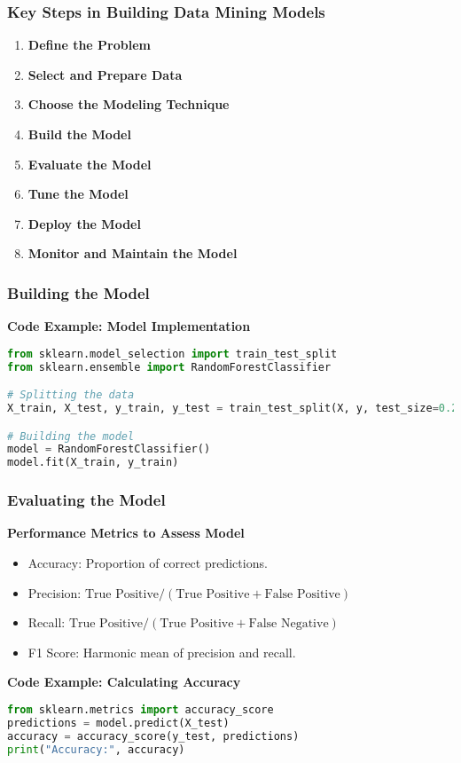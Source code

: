 \documentclass{beamer}
\begin{document}
\begin{frame}
    \frametitle{Key Steps in Building Data Mining Models}
    \begin{enumerate}
        \item \textbf{Define the Problem}
        \item \textbf{Select and Prepare Data}
        \item \textbf{Choose the Modeling Technique}
        \item \textbf{Build the Model}
        \item \textbf{Evaluate the Model}
        \item \textbf{Tune the Model}
        \item \textbf{Deploy the Model}
        \item \textbf{Monitor and Maintain the Model}
    \end{enumerate}
\end{frame}

\begin{frame}[fragile]
    \frametitle{Building the Model}
    \textbf{Code Example: Model Implementation}
    \begin{lstlisting}[language=Python]
from sklearn.model_selection import train_test_split
from sklearn.ensemble import RandomForestClassifier

# Splitting the data
X_train, X_test, y_train, y_test = train_test_split(X, y, test_size=0.2)

# Building the model
model = RandomForestClassifier()
model.fit(X_train, y_train)
    \end{lstlisting}
\end{frame}

\begin{frame}[fragile]
    \frametitle{Evaluating the Model}
    \textbf{Performance Metrics to Assess Model}
    \begin{itemize}
        \item Accuracy: Proportion of correct predictions.
        \item Precision: $\text{True Positive} / (\text{True Positive} + \text{False Positive})$
        \item Recall: $\text{True Positive} / (\text{True Positive} + \text{False Negative})$
        \item F1 Score: Harmonic mean of precision and recall.
    \end{itemize}
    
    \textbf{Code Example: Calculating Accuracy}
    \begin{lstlisting}[language=Python]
from sklearn.metrics import accuracy_score
predictions = model.predict(X_test)
accuracy = accuracy_score(y_test, predictions)
print("Accuracy:", accuracy)
    \end{lstlisting}
\end{frame}
\end{document}

